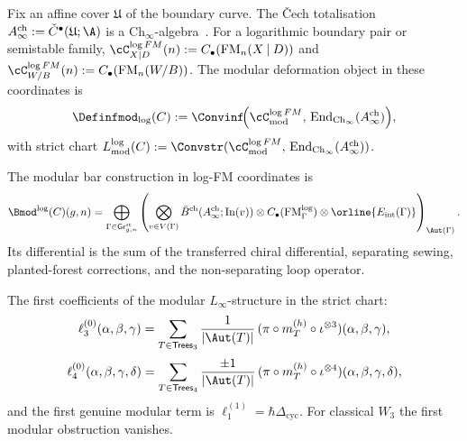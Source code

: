 \begin{construction}
\label{const:vol2-three-preprints-chain-level}
Fix an affine cover $\mathfrak U$ of the boundary curve.
The \v{C}ech totalisation
$A^{\mathrm{ch}}_\infty := \check C^\bullet(\mathfrak U;\A)$
is a $\mathrm{Ch}_\infty$-algebra~\cite[Theorem~3.1]{MS24}.
For a logarithmic boundary pair or semistable family,
$\cC^{\log FM}_{X\mathbin{|}D}(n):=C_\bullet(\operatorname{FM}_n(X\mathbin{|}D))$
and $\cC^{\log FM}_{W/B}(n):=C_\bullet(\operatorname{FM}_n(W/B))$.
The modular deformation object in these coordinates is
\[
{\Definfmod}_{\log}(C)
:=
\Convinf\!\Bigl(
\cC^{\log FM}_{\mathrm{mod}},\,
\operatorname{End}_{\mathrm{Ch}_\infty}(A^{\mathrm{ch}}_\infty)
\Bigr),
\]
with strict chart
$L^{\log}_{\mathrm{mod}}(C)
:=
\Convstr(\cC^{\log FM}_{\mathrm{mod}},\,
\operatorname{End}_{\mathrm{Ch}_\infty}(A^{\mathrm{ch}}_\infty))$.
\end{construction}

\begin{remark}
\label{rem:vol2-log-modular-bar-functor}
The modular bar construction in log-FM coordinates is
\[
\Bmod^{\log}(C)(g,n)
=
\bigoplus_{\Gamma\in \mathsf{Gr}^{\mathrm{st}}_{g,n}}
\left(
\bigotimes_{v\in V(\Gamma)} \bar B^{\mathrm{ch}}(A^{\mathrm{ch}}_\infty;\mathrm{In}(v))
\otimes
C_\bullet(\operatorname{FM}^{\log}_{\Gamma})
\otimes
\orline{E_{\mathrm{int}}(\Gamma)}
\right)_{\Aut(\Gamma)}.
\]
Its differential is the sum of the transferred chiral
differential, separating sewing, planted-forest corrections, and the
non-separating loop operator.
\end{remark}

\begin{computation}
\label{comp:vol2-low-genus-control}
The first coefficients of the modular $L_\infty$-structure in the strict chart:
\[
\ell_3^{(0)}(\alpha,\beta,\gamma)
=
\sum_{T\in\mathsf{Trees}_3}
\frac{1}{|\Aut(T)|}\,
(\pi\circ m_T^{(h)}\circ\iota^{\otimes 3})(\alpha,\beta,\gamma),
\]
\[
\ell_4^{(0)}(\alpha,\beta,\gamma,\delta)
=
\sum_{T\in\mathsf{Trees}_4}
\frac{\pm1}{|\Aut(T)|}\,
(\pi\circ m_T^{(h)}\circ\iota^{\otimes 4})(\alpha,\beta,\gamma,\delta),
\]
and the first genuine modular term is
$\ell_1^{(1)} = \hbar\Delta_{\mathrm{cyc}}$.
For classical $W_3$ the first modular obstruction vanishes.
\end{computation}

